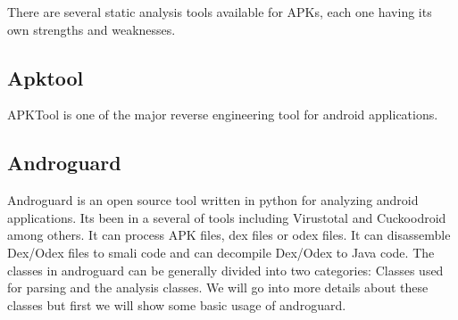 \documentclass[../main.tex]{subfile}
\begin{document}
		There are several static analysis tools available for APKs, each one having its own strengths and weaknesses.
		
		
		\lipsum[1]
		\subsection{Apktool}\label{sec:apktool}
		APKTool is one of the major reverse engineering tool for android applications.  
		\lipsum[2]
		\subsection{Androguard}\label{sec:androguard}
		Androguard is an open source tool written in python for analyzing android applications. Its been in a several of tools including Virustotal and Cuckoodroid among others. It can process APK files, dex files or odex files. It can disassemble Dex/Odex files to smali code and can decompile Dex/Odex to Java code. The classes in androguard can be generally divided into two categories: Classes used for parsing and the analysis classes. We will go into more details about these classes but first we will show some basic usage of androguard.
		
		
		
		\lipsum[1]
		\lipsum[1]
		\lipsum[1]
		\lipsum[1]
		\lipsum[1]
		\lipsum[1]
		\lipsum[1]
		\lipsum[1]
\end{document}
